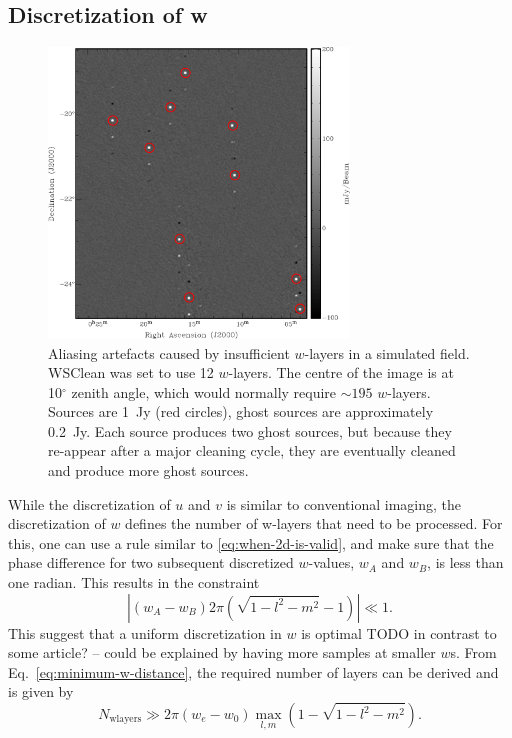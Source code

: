 \documentclass[useAMS,usenatbib]{mn2e}
\newcommand{\degree}{\ensuremath{^{\circ}}\xspace}
\begin{document}
\subsection{Discretization of w} \label{sec:gridding-w}
\begin{figure}
\begin{center}
\includegraphics[width=8cm]{img/aliasing-example-annotated}
\caption{Aliasing artefacts caused by insufficient $w$-layers in a simulated field. WSClean was set to use 12 $w$-layers. The centre of the image is at 10\degree zenith angle, which would normally require $\sim195$ $w$-layers. Sources are 1~Jy (red circles), ghost sources are approximately 0.2~Jy. Each source produces two ghost sources, but because they re-appear after a major cleaning cycle, they are eventually cleaned and produce more ghost sources. }
\label{fig:aliasing-example}
\end{center}
\end{figure}
While the discretization of $u$ and $v$ is similar to conventional imaging, the discretization of $w$ defines the number of w-layers that need to be processed. For this, one can use a rule similar to \eqref{eq:when-2d-is-valid}, and make sure that the phase difference for two subsequent discretized $w$-values, $w_A$ and $w_B$,  is less than one radian. This results in the constraint
\begin{equation} \label{eq:minimum-w-distance}
\left|\left(w_A - w_B\right) 2\pi (\sqrt{1-l^2-m^2}-1)\right| \ll 1.
\end{equation}
This suggest that a uniform discretization in $w$ is optimal TODO in contrast to some article? -- could be explained by having more samples at smaller $w$s. From Eq.~\eqref{eq:minimum-w-distance}, the required number of layers can be derived and is given by
\begin{equation} \label{eq:nwlayers-bound}
 N_\textrm{wlayers} \gg 2\pi \left(w_e - w_0\right) \max_{l,m} \left(1 - \sqrt{1-l^2-m^2}\right).
\end{equation}
\end{document}
